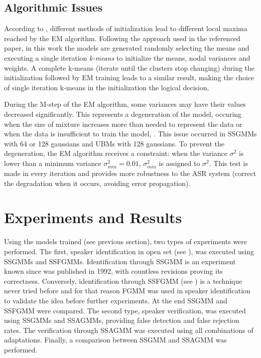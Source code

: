 \subsection{Algorithmic Issues}

According to , different methods of initialization lead to different local maxima reached by the EM algorithm. Following the approach used in the referenced paper, in this work the models are generated randomly selecting the means and executing a single iteration \emph{k-means} to initialize the means, nodal variances and weights. A complete k-means (iterate until the clusters stop changing) during the initialization followed by EM training leads to a similar result, making the choice of single iteration k-means in the initialization the logical decision.

During the M-step of the EM algorithm, some variances may have their values decreased significantly. This represents a degeneration of the model, occuring when the size of mixture increases more than needed to represent the data or when the data is insufficient to train the model, . This issue occurred in SSGMMs with 64 or 128 gaussians and UBMs with 128 gaussians. To prevent the degeneration, the EM algorithm receives a constraint: when the variance $\sigma^2$ is lower than a minimum variance $\sigma_{min}^2 = 0.01$, $\sigma_{min}^2$ is assigned to $\sigma^2$. This test is made in every iteration and provides more robustness to the ASR system (correct the degradation when it occurs, avoiding error propagation).

\section{Experiments and Results}
\label{sec:experiments-and-results}

Using the models trained (see previous section), two types of experiments were performed. The first, speaker identification in open set (see ), was executed using SSGMMs and SSFGMMs. Identification through SSGMM is an experiment known since  was published in 1992, with countless revisions proving its correctness. Conversely, identification through SSFGMM (see ) is a technique never tried before and for that reason FGMM was used in speaker identification to validate the idea before further experiments. At the end SSGMM and SSFGMM were compared. The second type, speaker verification, was executed using SSGMMs and SSAGMMs, providing false detection and false rejection rates. The verification through SSAGMM was executed using all combinations of adaptations. Finally, a comparison between SSGMM and SSAGMM was performed.

